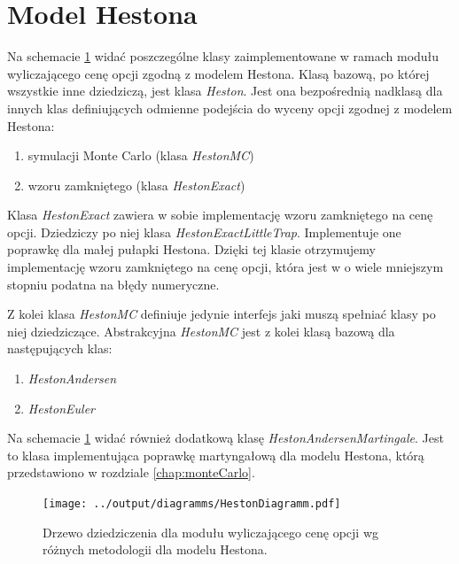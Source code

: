 \documentclass{pracamgr}
\begin{document}
\section{Model Hestona}
Na schemacie \ref{fig:currencyRisk} widać poszczególne klasy zaimplementowane w 
ramach modułu wyliczającego cenę opcji zgodną z modelem Hestona.
Klasą bazową, po której wszystkie inne dziedziczą, jest klasa \textit{Heston}.
Jest ona bezpośrednią nadklasą dla innych klas definiujących 
odmienne podejścia do wyceny opcji zgodnej z modelem Hestona:
\begin{enumerate}
  \item symulacji Monte Carlo (klasa \textit{HestonMC})
  \item wzoru zamkniętego (klasa \textit{HestonExact})
\end{enumerate}

Klasa \textit{HestonExact} zawiera w sobie implementację wzoru zamkniętego na cenę opcji.
Dziedziczy po niej klasa \textit{HestonExactLittleTrap}.
Implementuje one poprawkę dla małej pułapki Hestona. Dzięki tej klasie 
otrzymujemy implementację wzoru zamkniętego na cenę opcji, która jest w o wiele
mniejszym stopniu podatna na błędy numeryczne.

Z kolei klasa \textit{HestonMC} definiuje jedynie interfejs jaki muszą spełniać klasy po niej 
dziedziczące.
Abstrakcyjna \textit{HestonMC} jest z kolei klasą bazową dla następujących klas:
\begin{enumerate}
  \item \textit{HestonAndersen} 
  \item \textit{HestonEuler} 
\end{enumerate}
Na schemacie \ref{fig:currencyRisk} widać również dodatkową klasę
\textit{HestonAndersenMartingale}. Jest to klasa implementująca 
poprawkę martyngałową dla modelu Hestona, którą przedstawiono 
w rozdziale \ref{chap:monteCarlo}.


\begin{figure}
  \centering  
  \texttt{[image: ../output/diagramms/HestonDiagramm.pdf]}
  \caption{Drzewo dziedziczenia dla modułu wyliczającego 
  cenę opcji wg różnych metodologii dla modelu Hestona.}\label{fig:currencyRisk}
\end{figure}

\clearpage
\end{document}
